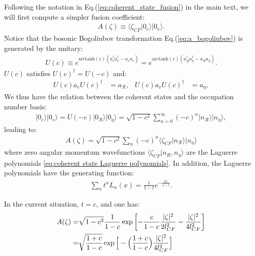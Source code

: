 \begin{subappendices}
    Following the notation in Eq.(\ref{eq:coherent_state_fusion}) in the main text, we will first compute a simpler fusion coefficient:
    \begin{align}
        A(\zeta)\equiv\langle\zeta_{CF}| 0_e\rangle|0_v\rangle.
    \end{align}
    Notice that the bosonic Bogoliubov transformation Eq.(\ref{eq:a_bogoliubov}) is generated by the unitary:
    \begin{align}
        U(c)\equiv e^{\text{arctanh}(c) (a_e^\dagger a_v^\dagger-a_ea_v)}=e^{\text{arctanh}(c) (a_{\mathcal R}^\dagger a_{\eta}^\dagger-a_{\mathcal R}a_{\eta})}.
    \end{align}
    $U(c)$ satisfies $U(c)^\dagger=U(-c)$ and:
    \begin{align}
        U(c) a_e U(c)^\dagger & =a_{\mathcal R}, & U(c) a_v U(c)^\dagger & =a_{\eta},
    \end{align}
    We thus have the relation between the coherent states and the occupation number basis:
    \begin{align}
        |0_e\rangle|0_v\rangle=U(-c)|0_{\mathcal R}\rangle|0_\eta\rangle=\sqrt{1-c^2}\sum_{n=0}^{\infty} (-c)^n|n_{\mathcal R}\rangle|n_\eta\rangle,
    \end{align}
    leading to:
    \begin{align}
        A(\zeta)=\sqrt{1-c^2}\sum_n (-c)^n\langle\zeta_{CF}| n_{\mathcal R}\rangle|n_{\eta}\rangle
    \end{align}
    where zero angular momentum wavefunctions $\langle\zeta_{CF}|n_R,n_\eta\rangle$ are the Laguerre polynomials \eqref{eq:coherent state Laguerre polynomials}.
    In addition, the Laguerre polynomials have the generating function:
    \begin{align}
        \sum_n t^n L_n(x)=\frac{1}{1-t}e^{-\frac{tx}{1-t}}.
    \end{align}

    In the current situation, $t=c$, and one has:
    \begin{align}
        A(\zeta)= & \sqrt{1-c^2}\frac{1}{1-c} \exp\left[-\frac{c}{1-c}\frac{|\zeta|^2}{2l_{CF}^2}-\frac{|\zeta|^2}{4l_{CF}^2}\right]\notag \\
        =         & \sqrt{\frac{1+c}{1-c}}\exp\Big[-\Big(\frac{1+c}{1-c}\Big)\frac{|\zeta|^2}{4l_{CF}^2}\Big]
    \end{align}


\end{subappendices}
